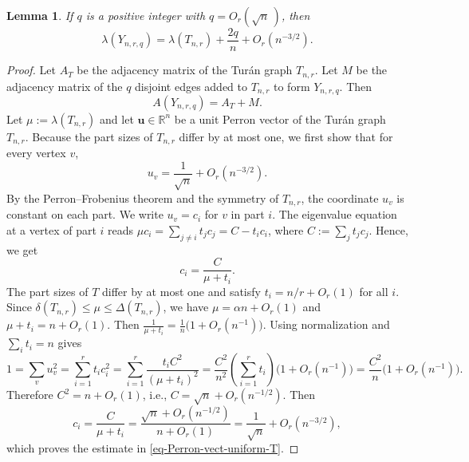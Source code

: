 \documentclass[11pt,a4paper]{article}
\newtheorem{lemma}[theorem]{Lemma}
\theoremstyle{definition}
\theoremstyle{plain}
\renewcommand{\le}{\leqslant}
\begin{document}
\begin{lemma} 
\label{lem:Y-expansion}
If $q$ is a positive integer with $q=O_r(\sqrt n \, )$, then
\begin{equation*}
        \lambda(Y_{n,r,q})
        =\lambda(T_{n,r})+\frac{2q}{n}+O_r(n^{-3/2}). 
\end{equation*}
\end{lemma}



\begin{proof}
Let $A_T$ be the adjacency matrix of the Tur\'{a}n graph $T_{n,r}$. Let $M$ be the adjacency matrix of the
$q$ disjoint edges added to $T_{n,r}$ to form $Y_{n,r,q}$. Then
\[
        A(Y_{n,r,q})=A_T+M.
\]
Let $  \mu:=\lambda(T_{n,r})$ 
and let $\bm{u}\in \mathbb{R}^n$ be a unit Perron vector of the Tur\'{a}n graph $T_{n,r}$. 
Because the part sizes of $T_{n,r}$ differ by at most one, we first show that for every vertex $v$,
\begin{equation}
        u_v=\frac1{\sqrt n}+O_r(n^{-3/2}).
        \label{eq-Perron-vect-uniform-T}
\end{equation} 
By the Perron--Frobenius theorem and the symmetry of $T_{n,r}$, the coordinate  $u_v$ is constant on
each part. We write $u_v=c_i$ for $v$ in part $i$. The eigenvalue equation at a
vertex of part $i$ reads $\mu c_i=\sum_{j\ne i}t_jc_j=C-t_ic_i$, where
$C:=\sum_j t_jc_j$. Hence, we get  
\begin{equation} \label{eq:coordinate}
c_i= \frac{C}{\mu+t_i}. 
\end{equation}
The part sizes of $T$ differ by at most one and satisfy $t_i=n/r+O_r(1)$ for all $i$. Since $\delta (T_{n,r})\le \mu \le \Delta (T_{n,r})$, we have  $\mu=\alpha n+O_r(1)$ and $ \mu+t_i=n+O_r(1)$. Then  
$  \frac{1}{\mu+t_i}=\frac{1}{n}\bigl(1+O_r(n^{-1})\bigr)$. 
Using normalization and $\sum_i t_i=n$ gives
\[
        1=\sum_v u_v^2=\sum_{i=1}^r t_ic_i^2=\sum_{i=1}^r\frac{t_iC^2}{(\mu+t_i)^2}
         =\frac{C^2}{n^2}\left(\sum_{i=1}^r t_i\right)\bigl(1+O_r(n^{-1})\bigr)
         =\frac{C^2}{n}\bigl(1+O_r(n^{-1})\bigr).
\]
Therefore $C^2=n+O_r(1)$, i.e.,  
$C=\sqrt n+O_r(n^{-1/2})$. Then 
\[
        c_i=\frac{C}{\mu+t_i}
           =\frac{\sqrt n+O_r(n^{-1/2})}{n+O_r(1)} 
           =\frac{1}{\sqrt n}+O_r(n^{-3/2}),
\]
which proves the estimate in \eqref{eq-Perron-vect-uniform-T}. 


\end{proof}
\end{document}
